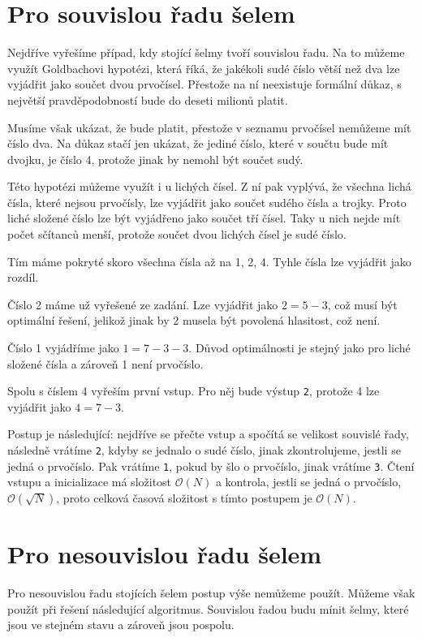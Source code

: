 \documentclass{fkssolpub}
\author{Ondřej Sedláček}
\begin{document}
\section{Pro souvislou řadu šelem}

Nejdříve vyřešíme případ, kdy stojící šelmy tvoří
souvislou řadu. Na to můžeme využít Goldbachovi
hypotézi, která říká, že jakékoli sudé číslo větší než
dva lze vyjádřit jako součet dvou prvočísel. Přestože
na ní neexistuje formální důkaz, s největší 
pravděpodobností bude do deseti milionů platit.

Musíme však ukázat, že bude platit, přestože v seznamu
prvočísel nemůžeme mít číslo dva. Na důkaz stačí jen
ukázat, že jediné číslo, které v součtu bude mít dvojku,
je číslo 4, protože jinak by nemohl být součet sudý.

Této hypotézi můžeme využít i u lichých čísel. Z ní
pak vyplývá, že všechna lichá čísla, které nejsou
prvočísly, lze vyjádřit jako součet sudého čísla a
trojky. Proto liché složené číslo lze být vyjádřeno
jako součet tří čísel. Taky u nich nejde mít počet
sčítanců menší, protože součet dvou lichých čísel je
sudé číslo.

Tím máme pokryté skoro všechna čísla až na 1, 2, 4.
Tyhle čísla lze vyjádřit jako rozdíl.

Číslo 2 máme už vyřešené ze zadání. Lze vyjádřit jako
$2 = 5 - 3$, což musí být optimální řešení, jelikož
jinak by 2 musela být povolená hlasitost, což není.

Číslo 1 vyjádříme jako $1 = 7 - 3 - 3$. Důvod optimálnosti
je stejný jako pro liché složené čísla a zároveň 1 není
prvočíslo.

Spolu s číslem 4 vyřeším první vstup. Pro něj bude
výstup \verb|2|, protože 4 lze vyjádřit jako
$4 = 7 - 3$.

Postup je následující: nejdříve se přečte vstup a 
spočítá se velikost souvislé řady, následně vrátíme
\verb|2|, kdyby se jednalo o sudé číslo, jinak
zkontrolujeme, jestli se jedná o prvočíslo. Pak
vrátíme \verb|1|, pokud by šlo o prvočíslo, jinak
vrátíme \verb|3|. Čtení vstupu a inicializace má
složitost $\mathcal{O}(N)$ a kontrola, jestli se
jedná o prvočíslo, $\mathcal{O}(\sqrt{N})$, proto
celková časová složitost s tímto postupem je
$\mathcal{O}(N)$.

\section{Pro nesouvislou řadu šelem}

Pro nesouvislou řadu stojících šelem postup výše
nemůžeme použít. Můžeme však použít při řešení
následující algoritmus. Souvislou řadou budu mínit
šelmy, které jsou ve stejném stavu a zároveň jsou
pospolu.
\end{document}
